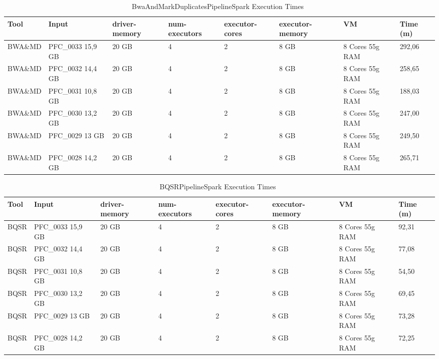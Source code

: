 \begin{table}[h]
	\caption{BwaAndMarkDuplicatesPipelineSpark Execution Times~\label{BWA_6_8}}
	\begin{center}
		\begin{tabular}{| m{5em} | m{5em} | m{3em} | m{4em} | m{4em} | m{5em} | m{4.5em} | m{3em} |}
    		\hline
    		Tool & Input & driver-memory & num-executors & executor-cores & executor-memory & VM & Time (m) \\ \hline
		    BWA\&MD & PFC\_0033 15,9 GB & 20 GB & 4 & 2 & 8 GB & 8 Cores 55g RAM & 292,06 \\ \hline
			BWA\&MD & PFC\_0032 14,4 GB & 20 GB & 4 & 2 & 8 GB & 8 Cores 55g RAM  & 258,65 \\ \hline
			BWA\&MD & PFC\_0031 10,8 GB & 20 GB & 4 & 2 & 8 GB & 8 Cores 55g RAM  & 188,03 \\ \hline
			BWA\&MD & PFC\_0030 13,2 GB& 20 GB & 4 & 2 & 8 GB & 8 Cores 55g RAM  & 247,00 \\ \hline
			BWA\&MD & PFC\_0029 13 GB & 20 GB & 4 & 2 & 8 GB & 8 Cores 55g RAM  & 249,50 \\ \hline
			BWA\&MD & PFC\_0028 14,2 GB & 20 GB & 4 & 2 & 8 GB & 8 Cores 55g RAM  & 265,71 \\ \hline
    	\end{tabular}
    \end{center}
\end{table}
\begin{table}[h]
	\caption{BQSRPipelineSpark Execution Times~\label{BQSR_6_8}}
	\begin{center}
		\begin{tabular}{| m{5em} | m{5em} | m{3em} | m{4em} | m{4em} | m{5em} | m{4.5em} | m{3em} |}
    		\hline
    		Tool & Input & driver-memory & num-executors & executor-cores & executor-memory & VM & Time (m) \\ \hline
		    BQSR & PFC\_0033 15,9 GB & 20 GB & 4 & 2 & 8 GB & 8 Cores 55g RAM & 92,31 \\ \hline
			BQSR & PFC\_0032 14,4 GB & 20 GB & 4 & 2 & 8 GB & 8 Cores 55g RAM  & 77,08 \\ \hline
			BQSR & PFC\_0031 10,8 GB & 20 GB & 4 & 2 & 8 GB & 8 Cores 55g RAM  & 54,50 \\ \hline
			BQSR & PFC\_0030 13,2 GB& 20 GB & 4 & 2 & 8 GB & 8 Cores 55g RAM  & 69,45 \\ \hline
			BQSR & PFC\_0029 13 GB & 20 GB & 4 & 2 & 8 GB & 8 Cores 55g RAM  & 73,28 \\ \hline
			BQSR & PFC\_0028 14,2 GB & 20 GB & 4 & 2 & 8 GB & 8 Cores 55g RAM  & 72,25 \\ \hline
    	\end{tabular}
    \end{center}
\end{table}

